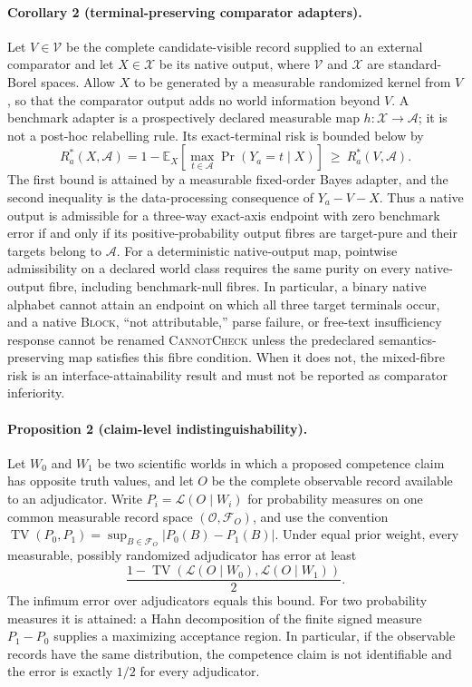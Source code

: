 \paragraph{Corollary 2 (terminal-preserving comparator adapters).}
Let $V\in\mathcal V$ be the complete candidate-visible record supplied to an
external comparator and let $X\in\mathcal X$ be its native output, where
$\mathcal V$ and $\mathcal X$ are standard-Borel spaces.  Allow $X$ to be
generated by a measurable randomized kernel from $V$, so that the comparator
output adds no world information beyond $V$.  A benchmark adapter is a
prospectively declared measurable map $h:\mathcal X\to\mathcal A$; it is not a
post-hoc relabelling rule.  Its exact-terminal
risk is bounded below by
\[
  R_a^*(X,\mathcal A)=1-\mathbb E_X\!\left[
    \max_{t\in\mathcal A}\Pr(Y_a=t\mid X)
  \right]
  \ \ge\ R_a^*(V,\mathcal A).
\]
The first bound is attained by a measurable fixed-order Bayes adapter, and the
second inequality is the data-processing consequence of $Y_a-V-X$.  Thus a
native output is admissible for a three-way exact-axis endpoint with zero
benchmark error if and only if its positive-probability output fibres are
target-pure and their targets belong to $\mathcal A$.  For a deterministic
native-output map, pointwise admissibility on a declared world class requires
the same purity on every native-output fibre, including benchmark-null fibres.
In particular, a binary native
alphabet cannot attain an endpoint on which all three target terminals occur,
and a native \textsc{Block}, ``not attributable,'' parse failure, or free-text
insufficiency response cannot be renamed \textsc{CannotCheck} unless the
predeclared semantics-preserving map satisfies this fibre condition.  When it
does not, the mixed-fibre risk is an interface-attainability result and must not
be reported as comparator inferiority.

\paragraph{Proposition 2 (claim-level indistinguishability).}
Let $W_0$ and $W_1$ be two scientific worlds in which a proposed competence
claim has opposite truth values, and let $O$ be the complete observable record
available to an adjudicator.  Write $P_i=\mathcal L(O\mid W_i)$ for probability
measures on one common measurable record space $(\mathcal O,\mathcal F_O)$, and
use the convention
$\operatorname{TV}(P_0,P_1)=\sup_{B\in\mathcal F_O}|P_0(B)-P_1(B)|$.
Under equal prior weight, every measurable, possibly randomized adjudicator has
error at least
\begin{equation}
  \frac{1-\operatorname{TV}
  (\mathcal{L}(O\mid W_0),\mathcal{L}(O\mid W_1))}{2}.
  \label{eq:claim-identifiability-bound}
\end{equation}
The infimum error over adjudicators equals this bound.  For two probability
measures it is attained: a Hahn decomposition of the finite signed measure
$P_1-P_0$ supplies a maximizing acceptance region.  In particular, if the
observable records have the same distribution, the competence claim is not
identifiable and the error is exactly $1/2$ for every adjudicator.

